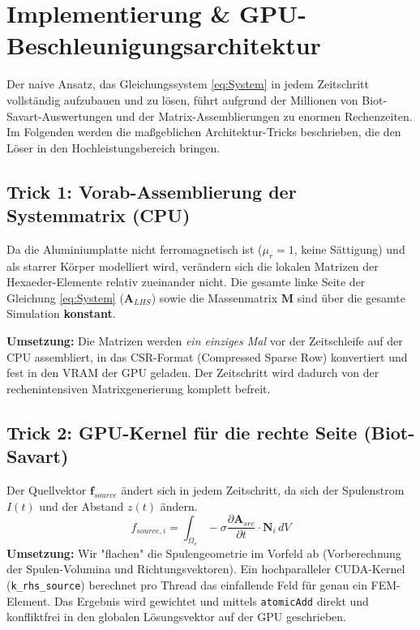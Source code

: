 \documentclass[11pt, a4paper]{article}
\begin{document}
\newpage
\section{Implementierung \& GPU-Beschleunigungsarchitektur}

Der naive Ansatz, das Gleichungssystem \eqref{eq:System} in jedem Zeitschritt vollständig aufzubauen und zu lösen, führt aufgrund der Millionen von Biot-Savart-Auswertungen und der Matrix-Assemblierungen zu enormen Rechenzeiten. Im Folgenden werden die maßgeblichen Architektur-Tricks beschrieben, die den Löser in den Hochleistungsbereich bringen.

\subsection{Trick 1: Vorab-Assemblierung der Systemmatrix (CPU)}
Da die Aluminiumplatte nicht ferromagnetisch ist ($\mu_r = 1$, keine Sättigung) und als starrer Körper modelliert wird, verändern sich die lokalen Matrizen der Hexaeder-Elemente relativ zueinander nicht. Die gesamte linke Seite der Gleichung \eqref{eq:System} ($\mathbf{A}_{LHS}$) sowie die Massenmatrix $\mathbf{M}$ sind über die gesamte Simulation \textbf{konstant}.

\textbf{Umsetzung:} Die Matrizen werden \textit{ein einziges Mal} vor der Zeitschleife auf der CPU assembliert, in das CSR-Format (Compressed Sparse Row) konvertiert und fest in den VRAM der GPU geladen. Der Zeitschritt wird dadurch von der rechenintensiven Matrixgenerierung komplett befreit.

\subsection{Trick 2: GPU-Kernel für die rechte Seite (Biot-Savart)}
Der Quellvektor $\mathbf{f}_{source}$ ändert sich in jedem Zeitschritt, da sich der Spulenstrom $I(t)$ und der Abstand $z(t)$ ändern. 
\begin{equation}
    f_{source, i} = \int_{\Omega_e} -\sigma \frac{\partial \mathbf{A}_{src}}{\partial t} \cdot \mathbf{N}_i \, dV
\end{equation}
\textbf{Umsetzung:} Wir "flachen" die Spulengeometrie im Vorfeld ab (Vorberechnung der Spulen-Volumina und Richtungsvektoren). Ein hochparalleler CUDA-Kernel (\texttt{k\_rhs\_source}) berechnet pro Thread das einfallende Feld für genau ein FEM-Element. Das Ergebnis wird gewichtet und mittels \texttt{atomicAdd} direkt und konfliktfrei in den globalen Lösungsvektor auf der GPU geschrieben.
\end{document}
